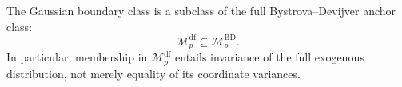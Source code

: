 The Gaussian boundary class is a subclass of the full Bystrova--Devijver anchor class:
\[
 \mathcal M_p^{\mathrm{df}}\subseteq\mathcal M_p^{\mathrm{BD}}.
\]
In particular, membership in \(\mathcal M_p^{\mathrm{df}}\) entails invariance of the full exogenous distribution, not merely equality of its coordinate variances.